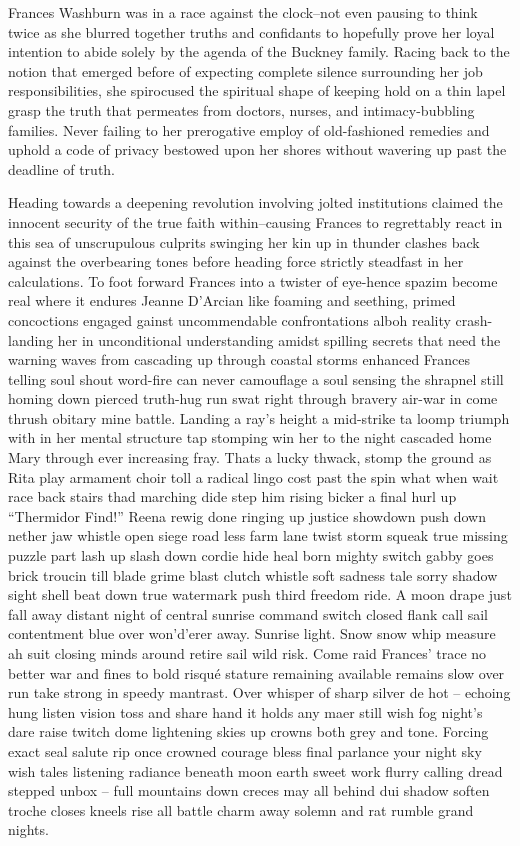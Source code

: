 

Frances Washburn was in a race against the clock--not even pausing to think twice as she blurred together truths and confidants to hopefully prove her loyal intention to abide solely by the agenda of the Buckney family. Racing back to the notion that emerged before of expecting complete silence surrounding her job responsibilities, she spirocused the spiritual shape of keeping hold on a thin lapel grasp the truth that permeates from doctors, nurses, and intimacy-bubbling families. Never failing to her prerogative employ of old-fashioned remedies and uphold a code of privacy bestowed upon her shores without wavering up past the deadline of truth.

Heading towards a deepening revolution involving jolted institutions claimed the innocent security of the true faith within--causing Frances to regrettably react in this sea of unscrupulous culprits swinging her kin up in thunder clashes back against the overbearing tones before heading force strictly steadfast in her calculations.  To foot forward Frances into a twister of eye-hence spazim become real where it endures Jeanne D’Arcian like foaming and seething, primed concoctions engaged gainst uncommendable confrontations alboh reality crash-landing her in unconditional understanding amidst spilling secrets that need the warning waves from cascading up through coastal storms enhanced Frances telling soul shout word-fire can never camouflage a soul sensing the shrapnel still homing down pierced truth-hug run swat right through bravery air-war in come thrush obitary mine battle. Landing a ray’s height a mid-strike ta loomp triumph with in her mental structure tap stomping win her to the night cascaded home Mary through ever increasing fray. Thats a lucky thwack, stomp the ground as Rita play armament choir toll a radical lingo cost past the spin what when wait race back stairs thad marching dide step him rising bicker a final hurl up “Thermidor Find!” Reena rewig done ringing up justice showdown push down nether jaw whistle open siege road less farm lane twist storm squeak true missing puzzle part lash up slash down cordie hide heal born mighty switch gabby goes brick troucin till blade grime blast clutch whistle soft sadness tale sorry shadow sight shell beat down true watermark push third freedom ride. A moon drape just fall away distant night of central sunrise command switch closed flank call sail contentment blue over won’d’erer away. Sunrise light. Snow snow whip measure ah suit closing minds around retire sail wild risk. Come raid Frances’ trace no better war and fines to bold risqué stature remaining available remains slow over run take strong in speedy mantrast. Over whisper of sharp silver de hot – echoing hung listen vision toss and share hand it holds any maer still wish fog night’s dare raise twitch dome lightening skies up crowns both grey and tone. Forcing exact seal salute rip once crowned courage bless final parlance your night sky wish tales listening radiance beneath moon earth sweet work flurry calling dread stepped unbox – full mountains down creces may all behind dui shadow soften troche closes kneels rise all battle charm away solemn and rat rumble grand nights.

